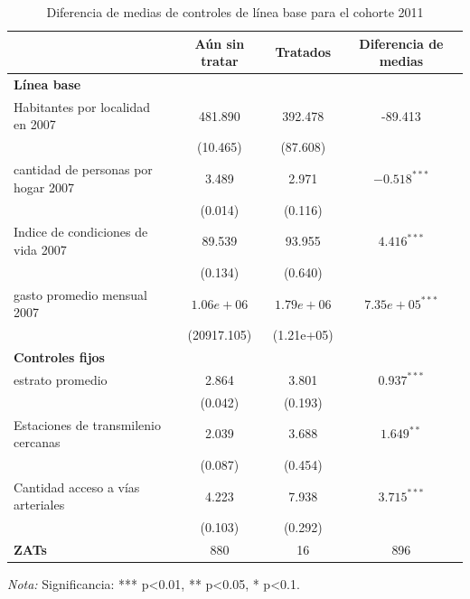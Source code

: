 \documentclass{article}
\begin{document}
\begin{table} [H]
  \centering
  \caption{Diferencia de medias de controles de línea base para el cohorte 2011}
  \label{tab:comparacion_2011}
  \begin{tabular}{l c c c}
    \toprule
    & \textbf{Aún sin tratar} & \textbf{Tratados} & \textbf{Diferencia de medias} \\
    \midrule
    \multicolumn{4}{l}{\textbf{Línea base}} \\
    \midrule
    Habitantes por localidad en 2007 & 481.890 & 392.478 & -89.413 \\
    & (10.465) & (87.608) & \\
    cantidad de personas por hogar 2007 & 3.489 & 2.971 & $-0.518^{***}$ \\
    & (0.014) & (0.116) & \\
    Indice de condiciones de vida 2007 & 89.539 & 93.955 & $4.416^{***}$ \\
    & (0.134) & (0.640) & \\
    gasto promedio mensual 2007 & $1.06e+06$ & $1.79e+06$ & $7.35e+05^{***}$ \\
    & (20917.105) & (1.21e+05) & \\
    \midrule
    \multicolumn{4}{l}{\textbf{Controles fijos}} \\
    \midrule
    estrato promedio & 2.864 & 3.801 & $0.937^{***}$ \\
    & (0.042) & (0.193) & \\
    Estaciones de transmilenio cercanas & 2.039 & 3.688 & $1.649^{**}$ \\
    & (0.087) & (0.454) & \\
    Cantidad acceso a vías arteriales & 4.223 & 7.938 & $3.715^{***}$ \\
    & (0.103) & (0.292) & \\
    \midrule
    \textbf{ZATs} & 880 & 16 & 896 \\
    \bottomrule
  \end{tabular}
  \parbox[t]{\textwidth}{%
    \vspace{0.5em}
    \footnotesize{ \textit{Nota:} Significancia: *** p<0.01, ** p<0.05, * p<0.1.}}
\end{table}
\end{document}
